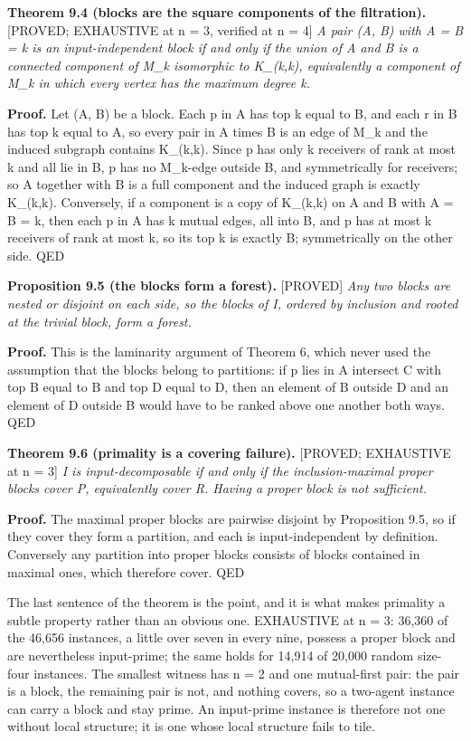 \documentclass[
  11pt,
]{article}
\begin{document}
\textbf{Theorem 9.4 (blocks are the square components of the
filtration).} {[}PROVED; EXHAUSTIVE at n = 3, verified at n = 4{]}
\emph{A pair (A, B) with \textbar A\textbar{} = \textbar B\textbar{} = k
is an input-independent block if and only if the union of A and B is a
connected component of M\_k isomorphic to K\_(k,k), equivalently a
component of M\_k in which every vertex has the maximum degree k.}

\textbf{Proof.} Let (A, B) be a block. Each p in A has top k equal to B,
and each r in B has top k equal to A, so every pair in A times B is an
edge of M\_k and the induced subgraph contains K\_(k,k). Since p has
only k receivers of rank at most k and all lie in B, p has no M\_k-edge
outside B, and symmetrically for receivers; so A together with B is a
full component and the induced graph is exactly K\_(k,k). Conversely, if
a component is a copy of K\_(k,k) on A and B with \textbar A\textbar{} =
\textbar B\textbar{} = k, then each p in A has k mutual edges, all into
B, and p has at most k receivers of rank at most k, so its top k is
exactly B; symmetrically on the other side. QED

\textbf{Proposition 9.5 (the blocks form a forest).} {[}PROVED{]}
\emph{Any two blocks are nested or disjoint on each side, so the blocks
of I, ordered by inclusion and rooted at the trivial block, form a
forest.}

\textbf{Proof.} This is the laminarity argument of Theorem 6, which
never used the assumption that the blocks belong to partitions: if p
lies in A intersect C with top \textbar B\textbar{} equal to B and top
\textbar D\textbar{} equal to D, then an element of B outside D and an
element of D outside B would have to be ranked above one another both
ways. QED

\textbf{Theorem 9.6 (primality is a covering failure).} {[}PROVED;
EXHAUSTIVE at n = 3{]} \emph{I is input-decomposable if and only if the
inclusion-maximal proper blocks cover P, equivalently cover R. Having a
proper block is not sufficient.}

\textbf{Proof.} The maximal proper blocks are pairwise disjoint by
Proposition 9.5, so if they cover they form a partition, and each is
input-independent by definition. Conversely any partition into proper
blocks consists of blocks contained in maximal ones, which therefore
cover. QED

The last sentence of the theorem is the point, and it is what makes
primality a subtle property rather than an obvious one. EXHAUSTIVE at n
= 3: 36,360 of the 46,656 instances, a little over seven in every nine,
possess a proper block and are nevertheless input-prime; the same holds
for 14,914 of 20,000 random size-four instances. The smallest witness
has n = 2 and one mutual-first pair: the pair is a block, the remaining
pair is not, and nothing covers, so a two-agent instance can carry a
block and stay prime. An input-prime instance is therefore not one
without local structure; it is one whose local structure fails to tile.
\end{document}

